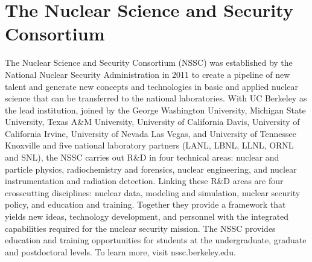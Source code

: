 
\section*{The Nuclear Science and Security Consortium}

The Nuclear Science and Security Consortium (NSSC) was established by the National Nuclear Security Administration in 2011 to create a pipeline of new talent and generate new concepts and technologies in basic and applied nuclear science that can be transferred to the national laboratories. 
With UC Berkeley as the lead institution, joined by the George Washington University, Michigan State University, Texas A\&M University, University of California Davis, University of California Irvine, University of Nevada Las Vegas, and University of Tennessee Knoxville and five national laboratory partners (LANL, LBNL, LLNL, ORNL and SNL), the NSSC carries out R\&D in four technical areas: nuclear and particle physics, radiochemistry and forensics, nuclear engineering, and nuclear instrumentation and radiation detection. 
Linking these R\&D areas are four crosscutting disciplines: nuclear data, modeling and simulation, nuclear security policy, and education and training. 
Together they provide a framework that yields new ideas, technology development, and personnel with the integrated capabilities required for the nuclear security mission. 
The NSSC provides education and training opportunities for students at the undergraduate, graduate and postdoctoral levels. 
To learn more, visit nssc.berkeley.edu.


